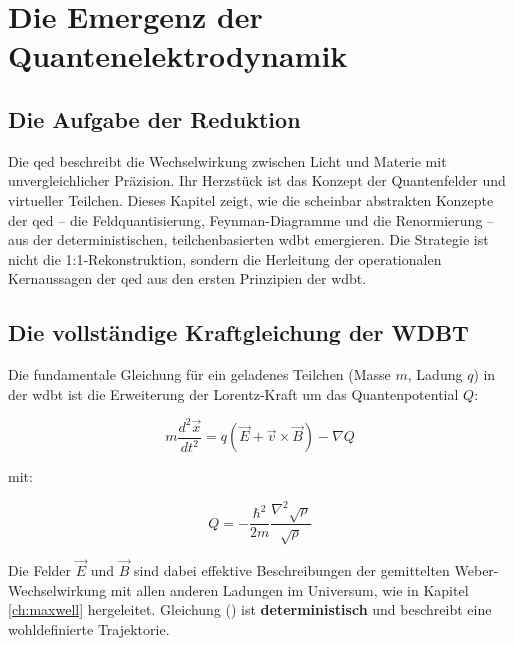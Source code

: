 \chapter{Die Emergenz der Quantenelektrodynamik}
\section{Die Aufgabe der Reduktion}
Die \gls{qed} beschreibt die Wechselwirkung zwischen Licht und Materie mit unvergleichlicher Präzision. Ihr Herzstück ist das Konzept der Quantenfelder und virtueller Teilchen. Dieses Kapitel zeigt,
wie die scheinbar abstrakten Konzepte der \gls{qed} – die Feldquantisierung, Feynman-Diagramme und die Renormierung – aus der deterministischen, teilchenbasierten \gls{wdbt} emergieren. Die Strategie
ist nicht die 1:1-Rekonstruktion, sondern die Herleitung der operationalen Kernaussagen der \gls{qed} aus den ersten Prinzipien der \gls{wdbt}.

\section{Die vollständige Kraftgleichung der WDBT}
Die fundamentale Gleichung für ein geladenes Teilchen (Masse $m$, Ladung $q$) in der \gls{wdbt} ist die Erweiterung der Lorentz-Kraft um das Quantenpotential $Q$:

\begin{equation}
    \label{eq:kraft_wdbt_em}
    m \frac{d^2\vec{x}}{dt^2} = q(\vec{E} + \vec{v} \times \vec{B}) - \nabla Q
\end{equation}

mit:

\begin{equation}
    \label{eq:quantenpotential_wdbt_em}
    Q = -\frac{\hbar^2}{2m} \frac{\nabla^2 \sqrt{\rho}}{\sqrt{\rho}}
\end{equation}

Die Felder $\vec{E}$ und $\vec{B}$ sind dabei effektive Beschreibungen der gemittelten Weber-Wechselwirkung mit allen anderen Ladungen im Universum, wie in Kapitel \ref{ch:maxwell} hergeleitet. Gleichung
() ist \textbf{deterministisch} und beschreibt eine wohldefinierte Trajektorie.
